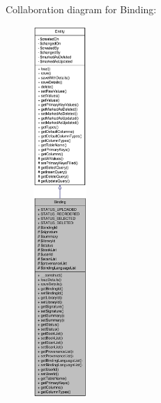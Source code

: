 Collaboration diagram for Binding:\nopagebreak
\begin{figure}[H]
\begin{center}
\leavevmode
\includegraphics[height=400pt]{classBinding__coll__graph}
\end{center}
\end{figure}
